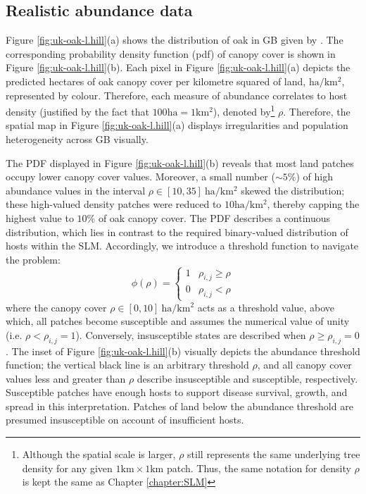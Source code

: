 \newpage

\subsection{Realistic abundance data}

Figure \ref{fig:uk-oak-l.hill}(a) shows the distribution of oak in GB given by \cite{hill.data}.
The corresponding probability density function (\acrshort{pdf}) of canopy cover is shown in Figure \ref{fig:uk-oak-l.hill}(b). Each pixel in Figure \ref{fig:uk-oak-l.hill}(a) depicts the predicted hectares
of oak canopy cover per kilometre squared of land, $\mathrm{ha/km^{2}}$, represented by colour. 
Therefore, each measure of abundance correlates to host density (justified by the fact that $100\mathrm{ha} = 1 \mathrm{km^2}$), denoted by\footnote{Although the spatial scale is larger, $\rho$ still represents the same underlying tree density for any given $1\mathrm{km} \times 1\mathrm{km}$ patch. Thus, the same notation for density $\rho$ is kept the same as Chapter \ref{chapter:SLM}} $\rho$. 
Therefore, the spatial map in Figure \ref{fig:uk-oak-l.hill}(a) displays irregularities and population heterogeneity across GB visually.

The PDF displayed in Figure \ref{fig:uk-oak-l.hill}(b) 
reveals that most land patches occupy lower canopy cover values.
Moreover, a small number ($\sim 5\%$) of high abundance values in the interval
$\rho \in [10, 35]\ \mathrm{ha/km^2}$ skewed the distribution; these high-valued density patches were reduced to $10\mathrm{ha/km^2}$, 
thereby capping the highest value to $10\%$ of oak canopy cover. 
The PDF describes a continuous distribution, which lies in contrast to the required binary-valued distribution of hosts 
within the SLM. Accordingly, we introduce a threshold function to navigate the problem:  
\begin{equation}
  \phi(\rho) =
  \begin{cases}
    1 & \rho_{i,j}\geq\rho \\
    0 & \rho_{i,j}<\rho
  \end{cases}
\end{equation}
where the canopy cover $\rho\in[0, 10]\ \mathrm{ha/km^{2}}$ acts as a threshold value, 
above which, all patches become susceptible and assumes the numerical value of unity (i.e. $\rho < \rho_{i,j} = 1$).
Conversely, insusceptible states are described when $\rho \geq \rho_{i,j}= 0$.
The inset of Figure \ref{fig:uk-oak-l.hill}(b) visually depicts the abundance threshold function; 
the vertical black line is an arbitrary threshold $\rho$, and all canopy cover values less and greater than
$\rho$ describe insusceptible and susceptible, respectively.
Susceptible patches have enough hosts to support disease survival, growth, and spread in this interpretation. %
Patches of land below the abundance threshold are presumed insusceptible on account of insufficient hosts.

